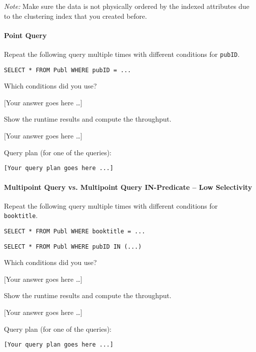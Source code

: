 \documentclass[11pt]{scrartcl}
\newcommand{\youranswerhere}{[Your answer goes here \ldots]}
\begin{document}
\emph{Note:} Make sure the data is not physically ordered by the indexed attributes due to the clustering index that you created before.

\paragraph{Point Query}

Repeat the following query multiple times with different conditions for \texttt{pubID}.

\begin{lstlisting}[style=dbtsql]
SELECT * FROM Publ WHERE pubID = ...
\end{lstlisting}

Which conditions did you use?

\youranswerhere{}

Show the runtime results and compute the throughput.

\youranswerhere{}

Query plan (for one of the queries):

{\small
\parskip0pt\begin{verbatim}
[Your query plan goes here ...]
\end{verbatim}}

\paragraph{Multipoint Query vs. Multipoint Query IN-Predicate -- Low Selectivity}

Repeat the following query multiple times with different conditions for \texttt{booktitle}.

\begin{lstlisting}[style=dbtsql]
SELECT * FROM Publ WHERE booktitle = ...
\end{lstlisting}

\begin{lstlisting}[style=dbtsql]
SELECT * FROM Publ WHERE pubID IN (...)
\end{lstlisting}


Which conditions did you use?

\youranswerhere{}

Show the runtime results and compute the throughput.

\youranswerhere{}

Query plan (for one of the queries):

{\small
\parskip0pt\begin{verbatim}
[Your query plan goes here ...]
\end{verbatim}}
\end{document}

